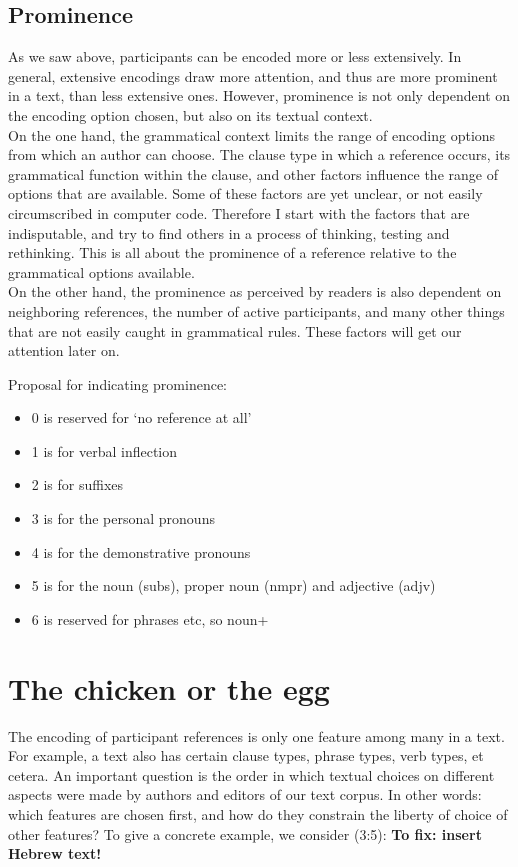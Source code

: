 \documentclass{report}
\begin{document}
\subsection{Prominence}
As we saw above, participants can be encoded more or less extensively. In general, extensive encodings draw more attention, and thus are more prominent in a text, than less extensive ones. However, prominence is not only dependent on the encoding option chosen, but also on its textual context.\\
On the one hand, the grammatical context limits the range of encoding options from which an author can choose. The clause type in which a reference occurs, its grammatical function within the clause, and other factors influence the range of options that are available. Some of these factors are yet unclear, or not easily circumscribed in computer code. Therefore I start with the factors that are indisputable, and try to find others in a process of thinking, testing and rethinking. This is all about the prominence of a reference relative to the grammatical options available.\\
On the other hand, the prominence as perceived by readers is also dependent on neighboring references, the number of active participants, and many other things that are not easily caught in grammatical rules. These factors will get our attention later on.

Proposal for indicating prominence:
\begin{itemize}
\item 0 is reserved for `no reference at all'
\item 1 is for verbal inflection
\item 2 is for suffixes
\item 3 is for the personal pronouns
\item 4 is for the demonstrative pronouns
\item 5 is for the noun (subs), proper noun (nmpr) and adjective (adjv)
\item 6 is reserved for phrases etc, so noun+
\end{itemize}

\section{The chicken or the egg}
The encoding of participant references is only one feature among many in a text. For example, a text also has certain clause types, phrase types, verb types, et cetera.
An important question is the order in which textual choices on different aspects were made by authors and editors of our text corpus. In other words: which features are chosen first, and how do they constrain the liberty of choice of other features?
To give a concrete example, we consider (3:5): \textbf{To fix: insert Hebrew text!}
\end{document}
